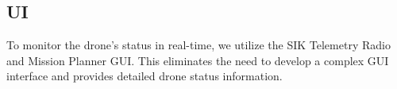 \subsection{UI}\label{subsection:F}
To monitor the drone's status in real-time, we utilize the SIK Telemetry Radio and Mission Planner GUI. This eliminates the need to develop a complex GUI interface and provides detailed drone status information.